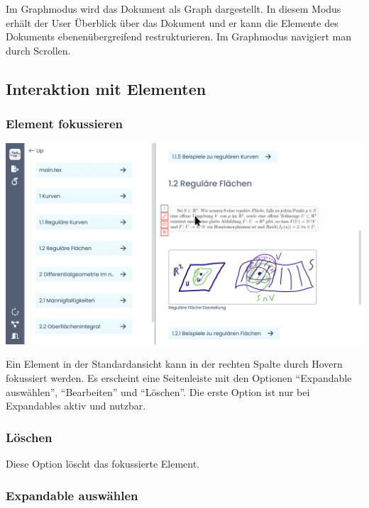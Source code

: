 Im Graphmodus wird das Dokument als Graph dargestellt.
In diesem Modus erhält der User Überblick über das Dokument und er kann die Elemente des Dokuments ebenenübergreifend
restrukturieren.
Im Graphmodus navigiert man durch Scrollen.

\subsection{Interaktion mit Elementen}
\label{subsec:interaktion-mit-elementen}

\subsubsection{Element fokussieren}

\begin{minipage}{\linewidth}
  \includegraphics[width=\textwidth]{assets/img/Item_Selected_Hover}
\end{minipage}

Ein Element in der Standardansicht kann in der rechten Spalte durch Hovern fokussiert werden.
Es erscheint eine Seitenleiste mit den Optionen \enquote{Expandable auswählen}, \enquote{Bearbeiten} und
\enquote{Löschen}.
Die erste Option ist nur bei Expandables aktiv und nutzbar.

\subsubsection{Löschen}

Diese Option löscht das fokussierte Element.

\subsubsection{Expandable auswählen}


